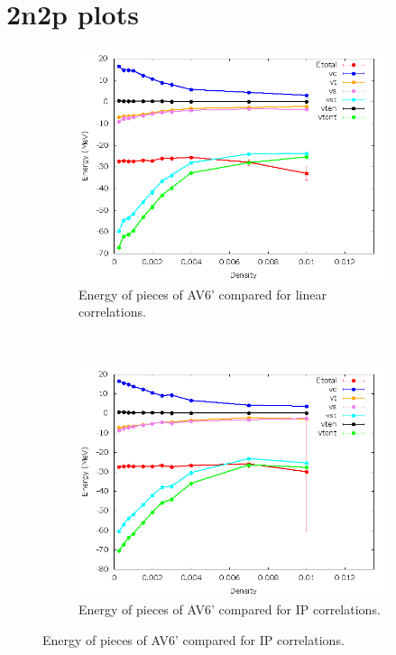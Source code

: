 \documentclass[12pt]{article}
\newcommand{\red}[1]{{\color{red}{#1}}}
\begin{document}
\section{2n2p plots}
\begin{figure}[h!]
   \centering
   \begin{subfigure}{0.49\textwidth}
      \includegraphics[width=\textwidth]{../av6_2n2p_lin.png}
      \caption{Energy of pieces of AV6' compared for linear correlations.}
   \end{subfigure}
   ~
   \begin{subfigure}{0.49\textwidth}
      \includegraphics[width=\textwidth]{../av6_2n2p_ip.png}
      \caption{\red{Placeholder for IP plot, currently lin.}Energy of pieces of AV6' compared for IP correlations.}

\end{subfigure}
\end{figure}
\end{document}
